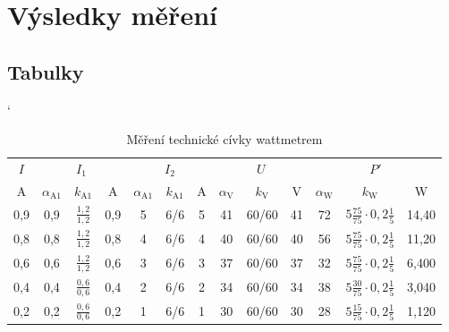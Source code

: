 \documentclass[a4paper, czech]{article}
\begin{document}
\section{Výsledky měření}

\subsection{Tabulky}

\begin{table}[H]
    \catcode`
    \centering
    \caption{Měření technické cívky wattmetrem}
    \renewcommand{\arraystretch}{1.25}
    \begin{tabular}{ccccccccccccc}
        \toprule
        $I$   & \multicolumn{3}{c}{$I_1$} & \multicolumn{3}{c}{$I_2$} & \multicolumn{3}{c}{$U$} & \multicolumn{3}{c}{$P'$}           \\
        \cmidrule(rl){1-1}
        \cmidrule(rl){2-4}
        \cmidrule(rl){5-7}
        \cmidrule(rl){8-10}
        \cmidrule(rl){11-13}
        A   & $\alpha_\text{A1}$  & $k_\text{A1}$      & A    & $\alpha_\text{A1}$  & $k_\text{A1}$    & A    & $\alpha_\text{V}$  & $k_\text{V}$      & V    & $\alpha_\text{W}$  & $k_\text{W}$                  & W     \\
        \midrule
        0,9 & 0,9  & $\frac{1,2}{1,2}$  & 0,9  & 5      & 6/6    & 5    & 41   & 60/60   & 41   & 72 & $5 \frac{75}{75} \cdot 0,2 \frac{1}{5}$ & 14,40 \\
        0,8 & 0,8  & $\frac{1,2}{1,2}$  & 0,8  & 4      & 6/6    & 4    & 40   & 60/60   & 40   & 56 & $5 \frac{75}{75} \cdot 0,2 \frac{1}{5}$ & 11,20 \\
        0,6 & 0,6  & $\frac{1,2}{1,2}$  & 0,6  & 3      & 6/6    & 3    & 37   & 60/60   & 37   & 32 & $5 \frac{75}{75} \cdot 0,2 \frac{1}{5}$ & 6,400 \\
        0,4 & 0,4  & $\frac{0,6}{0,6}$  & 0,4  & 2      & 6/6    & 2    & 34   & 60/60   & 34   & 38 & $5 \frac{30}{75} \cdot 0,2 \frac{1}{5}$ & 3,040 \\
        0,2 & 0,2  & $\frac{0,6}{0,6}$  & 0,2  & 1      & 6/6    & 1    & 30   & 60/60   & 30   & 28 & $5 \frac{15}{75} \cdot 0,2 \frac{1}{5}$ & 1,120 \\
        \bottomrule
    \end{tabular}
\end{table}
\end{document}
